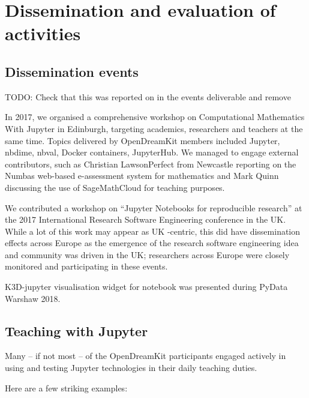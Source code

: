 \documentclass{deliverablereport}
\author{Mike Croucher, Hans Fanghor and Nicolas M. Thiéry}
\begin{document}
\maketitle
\enlargethispage{.5cm}
\githubissuedescription
\clearpage
\tableofcontents


\section{Dissemination and evaluation of activities}

\subsection{Dissemination events}

TODO: Check that this was reported on in the events deliverable and
remove

In 2017, we organised a comprehensive workshop on Computational
Mathematics With Jupyter in Edinburgh, targeting academics, researchers
and teachers at the same time. Topics delivered by OpenDreamKit members
included Jupyter, nbdime, nbval, Docker containers, JupyterHub. We
managed to engage external contributors, such as Christian
Lawson­Perfect from Newcastle reporting on the Numbas web-based
e-assessment system for mathematics and Mark Quinn discussing the use of
SageMathCloud for teaching purposes.

We contributed a workshop on ``Jupyter Notebooks for reproducible
research'' at the 2017 International Research Software Engineering
conference in the UK. While a lot of this work may appear as UK
-centric, this did have dissemination effects across Europe as the
emergence of the research software engineering idea and community was
driven in the UK; researchers across Europe were closely monitored and
participating in these events.

K3D-jupyter visualisation widget for
\Jupyter notebook was presented during PyData Warshaw 2018.


\subsection{Teaching with Jupyter}

Many -- if not most -- of the OpenDreamKit participants engaged actively
in using and testing Jupyter technologies in their daily teaching
duties.

Here are a few striking examples:
\end{document}
